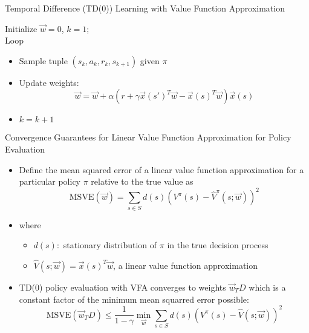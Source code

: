 \begin{frame}[c]{Temporal Difference (TD(0)) Learning with Value
		Function Approximation}

Initialize $\vec{w}= 0$, $k=1$;\\
Loop
	\begin{itemize}
		\item Sample tuple $(s_k, a_k, r_k, s_{k+1})$ given $\pi$
		\item Update weights:
		$$ \vec{w} = \vec{w} + \alpha( r + \gamma \vec{x}(s')^T \vec{w} - \vec{x}(s)^T\vec{w}) \vec{x}(s) $$
		\item $k = k + 1$
	\end{itemize}

\end{frame}
\begin{frame}[c]{Convergence Guarantees for Linear Value Function
		Approximation for Policy Evaluation}
	
\begin{itemize}
	\item Define the mean squared error of a linear value function
	approximation for a particular policy $\pi$ relative to the true value as
	$$\text{MSVE}(\vec{w}) = \sum_{s\in S} d(s) (V^\pi(s) - \hat{V}^\pi (s;\vec{w}))^2$$
	\item where
	\begin{itemize}
		\item $d(s):$ stationary distribution of $\pi$ in the true decision process
		\item $\hat{V}(s;\vec{w}) = \vec{x}(s)^T \vec{w}$, a linear value function approximation
	\end{itemize}
	\item TD(0) policy evaluation with VFA converges to weights $\vec{w}_TD$ which is a constant factor of the minimum mean squarred error possible:
	$$\text{MSVE}(\vec{w}_TD) \leq \frac{1}{1-\gamma} \min_\vec{w}\sum_{s\in S} d(s) (V^\pi(s) - \hat{V}(s;\vec{w}))^2$$
\end{itemize}

	
\end{frame}

